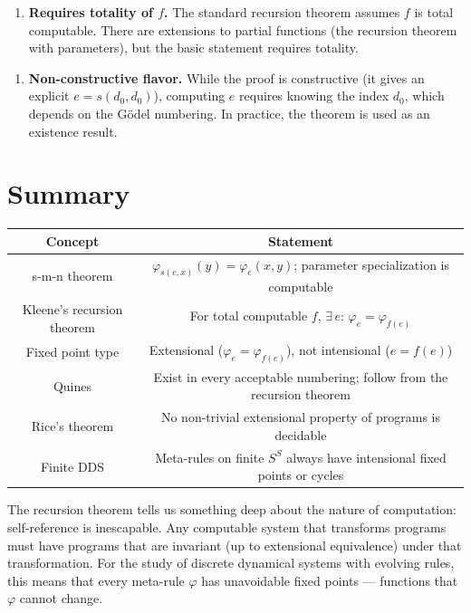 \begin{enumerate}
\item \textbf{Requires totality of $f$.} The standard recursion theorem assumes $f$ is total computable. There are extensions to partial functions (the recursion theorem with parameters), but the basic statement requires totality.
\end{enumerate}

\begin{enumerate}
\item \textbf{Non-constructive flavor.} While the proof is constructive (it gives an explicit $e = s(d_0, d_0)$), computing $e$ requires knowing the index $d_0$, which depends on the Gödel numbering. In practice, the theorem is used as an existence result.
\end{enumerate}

\section{Summary}

\begin{center}
\begin{tabular}{cc}
\toprule
Concept & Statement \\
\midrule
s-m-n theorem & $\varphi_{s(e,x)}(y) = \varphi_e(x,y)$; parameter specialization is computable \\
Kleene's recursion theorem & For total computable $f$, $\exists\, e$: $\varphi_e = \varphi_{f(e)}$ \\
Fixed point type & Extensional ($\varphi_e = \varphi_{f(e)}$), not intensional ($e = f(e)$) \\
Quines & Exist in every acceptable numbering; follow from the recursion theorem \\
Rice's theorem & No non-trivial extensional property of programs is decidable \\
Finite DDS & Meta-rules on finite $S^S$ always have intensional fixed points or cycles \\
\bottomrule
\end{tabular}
\end{center}

The recursion theorem tells us something deep about the nature of computation: self-reference is inescapable. Any computable system that transforms programs must have programs that are invariant (up to extensional equivalence) under that transformation. For the study of discrete dynamical systems with evolving rules, this means that every meta-rule $\varphi$ has unavoidable fixed points --- functions that $\varphi$ cannot change.

